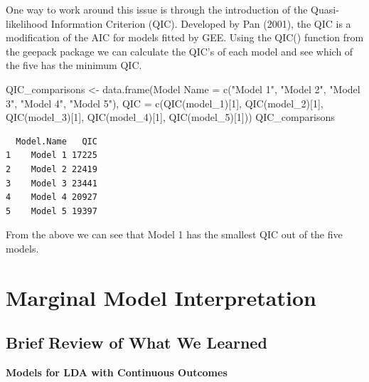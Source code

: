 \documentclass[
  letterpaper,
  DIV=11,
  numbers=noendperiod]{scrreprt}
\newenvironment{Shaded}{\begin{snugshade}}{\end{snugshade}}
\newcommand{\AttributeTok}[1]{\textcolor[rgb]{0.40,0.45,0.13}{#1}}
\newcommand{\DecValTok}[1]{\textcolor[rgb]{0.68,0.00,0.00}{#1}}
\newcommand{\FunctionTok}[1]{\textcolor[rgb]{0.28,0.35,0.67}{#1}}
\newcommand{\NormalTok}[1]{\textcolor[rgb]{0.00,0.23,0.31}{#1}}
\newcommand{\OtherTok}[1]{\textcolor[rgb]{0.00,0.23,0.31}{#1}}
\newcommand{\StringTok}[1]{\textcolor[rgb]{0.13,0.47,0.30}{#1}}
\begin{document}
One way to work around this issue is through the introduction of the
Quasi-likelihood Information Criterion (QIC). Developed by Pan (2001),
the QIC is a modification of the AIC for models fitted by GEE. Using the
QIC() function from the geepack package we can calculate the QIC's of
each model and see which of the five has the minimum QIC.

\begin{Shaded}
\begin{Highlighting}[]
\NormalTok{QIC\_comparisons }\OtherTok{\textless{}{-}} \FunctionTok{data.frame}\NormalTok{(}\StringTok{\textasciigrave{}}\AttributeTok{Model Name}\StringTok{\textasciigrave{}} \OtherTok{=} \FunctionTok{c}\NormalTok{(}\StringTok{"Model 1"}\NormalTok{, }\StringTok{"Model 2"}\NormalTok{, }\StringTok{"Model 3"}\NormalTok{, }\StringTok{"Model 4"}\NormalTok{,}
    \StringTok{"Model 5"}\NormalTok{), }\AttributeTok{QIC =} \FunctionTok{c}\NormalTok{(}\FunctionTok{QIC}\NormalTok{(model\_1)[}\DecValTok{1}\NormalTok{], }\FunctionTok{QIC}\NormalTok{(model\_2)[}\DecValTok{1}\NormalTok{], }\FunctionTok{QIC}\NormalTok{(model\_3)[}\DecValTok{1}\NormalTok{], }\FunctionTok{QIC}\NormalTok{(model\_4)[}\DecValTok{1}\NormalTok{],}
    \FunctionTok{QIC}\NormalTok{(model\_5)[}\DecValTok{1}\NormalTok{]))}
\NormalTok{QIC\_comparisons}
\end{Highlighting}
\end{Shaded}

\begin{verbatim}
  Model.Name   QIC
1    Model 1 17225
2    Model 2 22419
3    Model 3 23441
4    Model 4 20927
5    Model 5 19397
\end{verbatim}

From the above we can see that Model 1 has the smallest QIC out of the
five models.

\hypertarget{sec-longi-GEE-interpretation}{%
\chapter{Marginal Model
Interpretation}\label{sec-longi-GEE-interpretation}}

\hypertarget{brief-review-of-what-we-learned}{%
\section{Brief Review of What We
Learned}\label{brief-review-of-what-we-learned}}

\textbf{Models for LDA with Continuous Outcomes}
\end{document}
